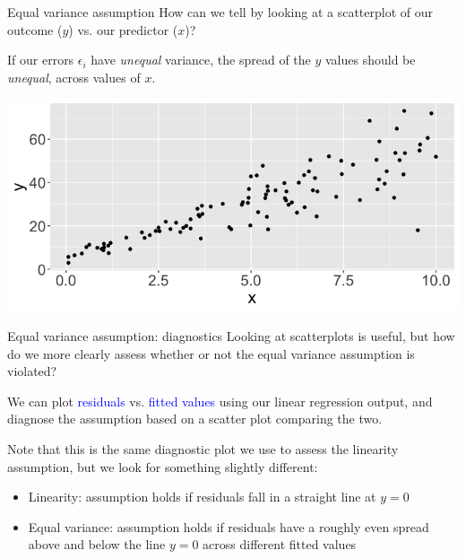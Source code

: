 \documentclass[10pt,t]{beamer}
\begin{document}
\begin{frame}{Equal variance assumption}
How can we tell by looking at a scatterplot of our outcome ($y$) vs. our predictor ($x$)?

\vspace{0.3cm}

If our errors $\epsilon_i$ have \textit{unequal} variance, the spread of the $y$ values should be \textit{unequal}, across values of $x$.

\vspace{0.3cm}
\centering

\includegraphics[scale=0.3]{nonconstvar.png}

\end{frame}

\begin{frame}{Equal variance assumption: diagnostics}
Looking at scatterplots is useful, but how do we more clearly assess whether or not the equal variance assumption is violated?

\vspace{0.3cm}

We can plot \textcolor{blue}{residuals} vs. \textcolor{blue}{fitted values} using our linear regression output, and diagnose the assumption based on a scatter plot comparing the two.

\vspace{0.3cm}

Note that this is the same diagnostic plot we use to assess the linearity assumption, but we look for something slightly different:

\vspace{0.3cm}

\begin{itemize}
	\item Linearity: assumption holds if residuals fall in a straight line at $y = 0$
	\item Equal variance: assumption holds if residuals have a roughly even spread above and below the line $y = 0$ across different fitted values
\end{itemize}

\end{frame}
\end{document}
